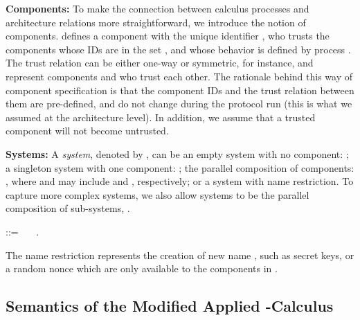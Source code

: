 \documentclass{llncs}
\begin{document}
\textbf{Components:} To make the connection between calculus processes and architecture 
relations more straightforward, we introduce the notion of components.  defines a component with the unique identifier 
, who trusts the components whose IDs are in the set , and whose behavior is 
defined by process . The trust relation can be either one-way or symmetric, for instance, 
 and  
represent components  and  who trust each other. The rationale behind this way of 
component specification is that the component IDs and the trust relation between them are 
pre-defined, and do not change during the protocol run (this is what we assumed at 
the architecture level). In addition, we assume that a trusted component will not become untrusted. 

\textbf{Systems:}
A \textit{system}, denoted by , can be an empty system with no component: ; 
a singleton system with one component: ; the parallel 
composition of components:   
, where  and  
may include  and , respectively; or a system with name restriction. To capture 
more complex systems, we also allow systems to be the parallel composition of sub-systems, 
  .
\begin{center}    
 ::=  \  \  \    . \end{center}

\noindent 
The name restriction  represents the creation of new name , such as secret keys, or a random 
nonce which are only available to the components in . 

\subsection{Semantics of the Modified Applied -Calculus}
\label{sec:calcsemantics}
\end{document}
